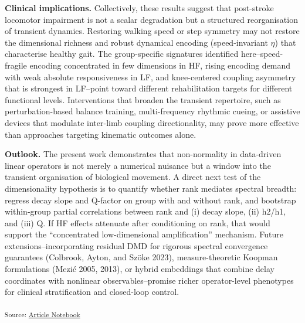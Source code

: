 \documentclass[
  letterpaper,
  DIV=11,
  numbers=noendperiod]{scrartcl}
\begin{document}
\textbf{Clinical implications.} Collectively, these results suggest that
post-stroke locomotor impairment is not a scalar degradation but a
structured reorganisation of transient dynamics. Restoring walking speed
or step symmetry may not restore the dimensional richness and robust
dynamical encoding (speed-invariant \(\eta\)) that characterise healthy
gait. The group-specific signatures identified here--speed-fragile
encoding concentrated in few dimensions in HF, rising encoding demand
with weak absolute responsiveness in LF, and knee-centered coupling
asymmetry that is strongest in LF--point toward different rehabilitation
targets for different functional levels. Interventions that broaden the
transient repertoire, such as perturbation-based balance training,
multi-frequency rhythmic cueing, or assistive devices that modulate
inter-limb coupling directionality, may prove more effective than
approaches targeting kinematic outcomes alone.

\textbf{Outlook.} The present work demonstrates that non-normality in
data-driven linear operators is not merely a numerical nuisance but a
window into the transient organisation of biological movement. A direct
next test of the dimensionality hypothesis is to quantify whether rank
mediates spectral breadth: regress decay slope and Q-factor on group
with and without rank, and bootstrap within-group partial correlations
between rank and (i) decay slope, (ii) h2/h1, and (iii) Q. If HF effects
attenuate after conditioning on rank, that would support the
``concentrated low-dimensional amplification'' mechanism. Future
extensions--incorporating residual DMD for rigorous spectral convergence
guarantees (Colbrook, Ayton, and Szöke 2023), measure-theoretic Koopman
formulations (Mezić 2005, 2013), or hybrid embeddings that combine delay
coordinates with nonlinear observables--promise richer operator-level
phenotypes for clinical stratification and closed-loop control.

\textsubscript{Source:
\href{https://michaelhess17.github.io/Gait_NonNormality_Paper/index.qmd.html}{Article
Notebook}}
\end{document}
